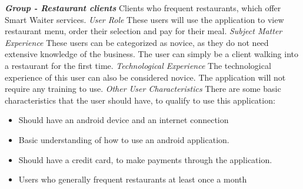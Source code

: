 \documentclass[12pt, titlepage]{article}
\begin{document}
\textbf{\textit{Group - Restaurant clients}}\newline
Clients who frequent restaurants, which offer Smart Waiter services.\newline
\newline
\textit{User Role}\newline
These users will use the application to view restaurant menu, order their selection and pay for their meal.\newline\newline
\textit{Subject Matter Experience}\newline
These users can be categorized as novice, as they do not need extensive knowledge of the business. The user can simply be a client walking into a restaurant for the first time.\newline\newline
\textit{Technological Experience}\newline
The technological experience of this user can also be considered novice. The application will not require any training to use.\newline\newline
\textit{Other User Characteristics}\newline
There are some basic characteristics that the user should have, to qualify to use this application:
\begin{itemize}
  \item Should have an android device and an internet connection
  \item Basic understanding of how to use an android application. 
  \item 	Should have a credit card, to make payments through the application. 
  \item 	Users who generally frequent restaurants at least once a month
\end{itemize}
\end{document}
